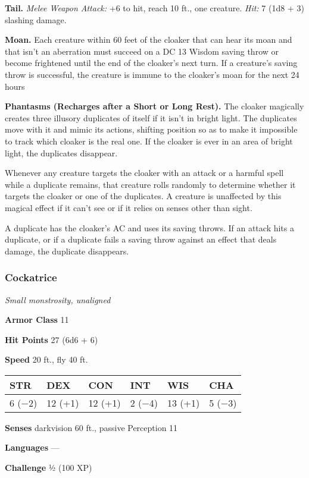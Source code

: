 \documentclass[
]{article}
\begin{document}
\textbf{Tail.} \emph{Melee Weapon Attack:} +6 to hit, reach 10 ft., one
creature. \emph{Hit:} 7 (1d8 + 3) slashing damage.

\textbf{Moan.} Each creature within 60 feet of the cloaker that can hear
its moan and that isn't an aberration must succeed on a DC 13 Wisdom
saving throw or become frightened until the end of the cloaker's next
turn. If a creature's saving throw is successful, the creature is immune
to the cloaker's moan for the next 24 hours

\textbf{Phantasms (Recharges after a Short or Long Rest).} The cloaker
magically creates three illusory duplicates of itself if it isn't in
bright light. The duplicates move with it and mimic its actions,
shifting position so as to make it impossible to track which cloaker is
the real one. If the cloaker is ever in an area of bright light, the
duplicates disappear.

Whenever any creature targets the cloaker with an attack or a harmful
spell while a duplicate remains, that creature rolls randomly to
determine whether it targets the cloaker or one of the duplicates. A
creature is unaffected by this magical effect if it can't see or if it
relies on senses other than sight.

A duplicate has the cloaker's AC and uses its saving throws. If an
attack hits a duplicate, or if a duplicate fails a saving throw against
an effect that deals damage, the duplicate disappears.

\hypertarget{cockatrice}{%
\subsubsection{Cockatrice}\label{cockatrice}}

\emph{Small monstrosity, unaligned}

\textbf{Armor Class} 11

\textbf{Hit Points} 27 (6d6 + 6)

\textbf{Speed} 20 ft., fly 40 ft.

\begin{longtable}[]{@{}llllll@{}}
\toprule
STR & DEX & CON & INT & WIS & CHA\tabularnewline
\midrule
\endhead
6 (−2) & 12 (+1) & 12 (+1) & 2 (−4) & 13 (+1) & 5 (−3)\tabularnewline
\bottomrule
\end{longtable}

\textbf{Senses} darkvision 60 ft., passive Perception 11

\textbf{Languages} ---

\textbf{Challenge} ½ (100 XP)
\end{document}

